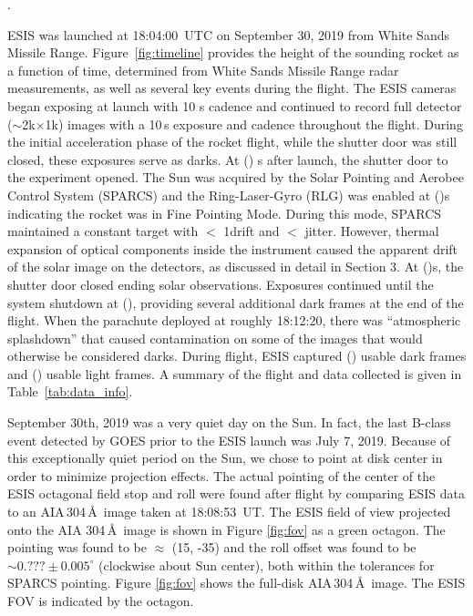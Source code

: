 .

		ESIS was launched at 18:04:00~UTC on September 30, 2019 from White Sands Missile Range.  Figure~\ref{fig:timeline} provides the height of the sounding rocket as a function of time, determined from White Sands Missile Range radar measurements, as well as several key events during the flight.  The ESIS cameras began exposing at launch with 10 s cadence and continued to record full detector ($\sim$2k$\times$1k) images with a 10\,s exposure and cadence throughout the flight. During the initial acceleration phase of the rocket flight, while the shutter door was still closed, these exposures serve as darks.  At () s after launch, the shutter door to the experiment opened.  The Sun was acquired by the Solar Pointing and Aerobee Control System (SPARCS) and the Ring-Laser-Gyro (RLG) was enabled at ()s indicating the rocket was in Fine Pointing Mode.  During this mode, SPARCS maintained a constant target with $<$ 1\arcsec drift and $< $ jitter.  However, thermal expansion of optical components inside the instrument caused the apparent drift of the solar image on the detectors, as discussed in detail in Section 3.  At ()s, the shutter door closed ending solar observations.  Exposures continued until the system shutdown at (), providing several additional dark frames at the end of the flight.  When the  parachute  deployed at roughly 18:12:20, there was  ``atmospheric splashdown'' that caused contamination on some of the images that would otherwise be considered darks.  During flight, ESIS captured () usable dark frames and () usable light frames.  A summary of the flight and data collected is given in Table~\ref{tab:data_info}.
		
		September 30th, 2019 was a very quiet day on the Sun.  In fact, the last  B-class event detected by GOES \citep{GOES} prior to the ESIS launch was July 7, 2019.  Because of this exceptionally quiet period on the Sun, we chose to point at disk center in order to minimize projection effects.   The actual pointing of the center of the ESIS octagonal field stop and roll were found after flight by comparing ESIS  data to an AIA\,304\,\AA\ image taken at 18:08:53~UT.  The ESIS field of view projected onto the AIA 304\,\AA\ image is shown in Figure \ref{fig:fov} as a green octagon.  The pointing was found to be $\approx$ (15\arcsec, -35\arcsec) and the roll offset was found to be $\sim0.???\pm 0.005^\circ$ (clockwise about Sun center), both within the tolerances for SPARCS pointing.  Figure \ref{fig:fov} shows the full-disk AIA\,304\,\AA\ image. The ESIS FOV is indicated by the octagon.  
		
